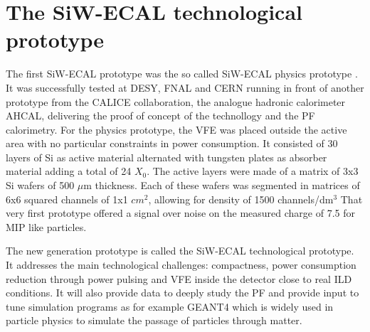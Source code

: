 \documentclass[final,3p,times,twocolumn]{elsarticle}
\begin{document}
\section{The SiW-ECAL technological prototype}

The first SiW-ECAL prototype was the so called SiW-ECAL physics prototype \cite{Adloff:2011ha,Anduze:2008hq,Adloff:2008aa,Adloff:2010xj,CALICE:2011aa,Bilki:2014uep}.
It was successfully tested at DESY, FNAL and CERN running in front of another prototype from the CALICE
collaboration, the analogue hadronic calorimeter AHCAL, delivering the proof of concept of the technollogy
and the PF calorimetry.
For the physics prototype, the VFE was placed outside the active area with no particular constraints in power consumption.
It consisted of 30 layers of Si as active material alternated with tungsten plates as absorber material
adding a total of 24 $X_{0}$.
The active layers were made of a matrix of 3x3 Si wafers of 500 $\mu$m thickness. Each of these wafers was segmented in matrices of
6x6 squared channels of 1x1 $cm^{2}$, allowing for density of 1500 channels/dm$^{3}$
That very first prototype offered a signal over noise on the measured charge of 7.5 for MIP like 
particles.

The new generation prototype is called the SiW-ECAL technological prototype. It addresses the main technological challenges: compactness,
power consumption reduction through power pulsing and VFE inside the detector close to real ILD conditions.
It will also provide data to deeply study the PF and provide input to tune simulation programs as for example
GEANT4\cite{Agostinelli:2002hh,Allison:2006ve,Allison:2016lfl} which is widely used
in particle physics to simulate the passage of particles through matter.
\end{document}
